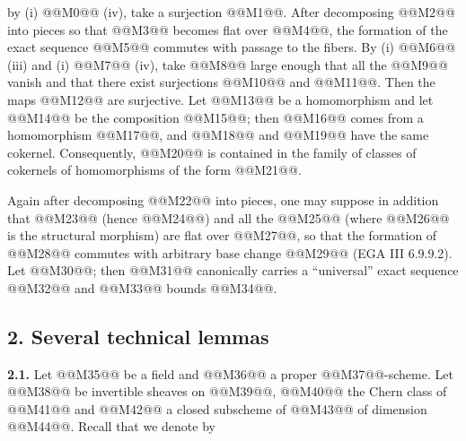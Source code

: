 by (i) @@M0@@ (iv), take a surjection @@M1@@. After decomposing @@M2@@ into pieces so that @@M3@@ becomes flat over @@M4@@, the formation of the exact sequence @@M5@@ commutes with passage to the fibers. By (i) @@M6@@ (iii) and (i) @@M7@@ (iv), take @@M8@@ large enough that all the @@M9@@ vanish and that there exist surjections @@M10@@ and @@M11@@. Then the maps @@M12@@ are surjective. Let @@M13@@ be a homomorphism and let @@M14@@ be the composition @@M15@@; then @@M16@@ comes from a homomorphism @@M17@@, and @@M18@@ and @@M19@@ have the same cokernel. Consequently, @@M20@@ is contained in the family of classes of cokernels of homomorphisms of the form @@M21@@.

Again after decomposing @@M22@@ into pieces, one may suppose in addition that @@M23@@ (hence @@M24@@) and all the @@M25@@ (where @@M26@@ is the structural morphism) are flat over @@M27@@, so that the formation of @@M28@@ commutes with arbitrary base change @@M29@@ (EGA III 6.9.9.2). Let @@M30@@; then @@M31@@ canonically carries a ``universal'' exact sequence
@@M32@@
and @@M33@@ bounds @@M34@@.

\subsection*{2. Several technical lemmas}
\textbf{2.1.} Let @@M35@@ be a field and @@M36@@ a proper @@M37@@-scheme. Let @@M38@@ be invertible sheaves on @@M39@@, @@M40@@ the Chern class of @@M41@@ and @@M42@@ a closed subscheme of @@M43@@ of dimension @@M44@@. Recall that we denote by

